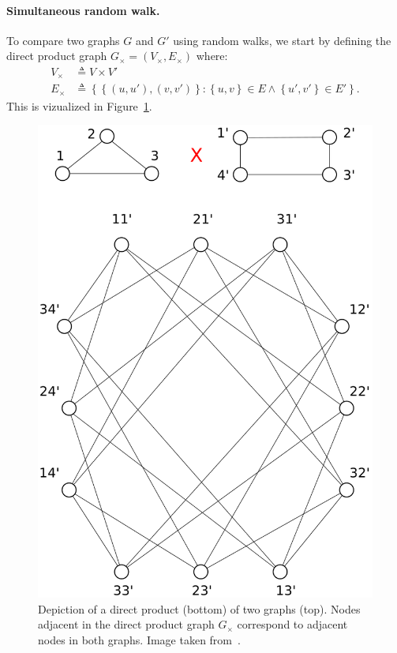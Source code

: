             \paragraph{Simultaneous random walk.}
                To compare two graphs \(G\) and \(G'\) using random walks, we start by defining the direct product graph $G_{\times} = \left(V_{\times}, E_{\times}\right)$ where:
                \begin{align}
                    \label{eq::direct_product_graph}
                    V_{\times} &\triangleq V \times V'\\
                    E_{\times} &\triangleq \left\{\left\{(u, u'), (v, v')\right\}: \left\{u,v\right\} \in E \wedge \left\{u',v'\right\} \in E'\right\}.
                \end{align}
                This is vizualized in Figure~\ref{fig::direct_product_graph}.
                \begin{figure}[htbp]
                    \centering
                    \includegraphics[height=.4\textheight]{images/related_work/direct_product_graphs}
                    \caption[
                        Depiction of a direct product of two graphs.
                    ]{
                        \label{fig::direct_product_graph}
                        Depiction of a direct product (bottom) of two graphs (top).
                        Nodes adjacent in the direct product graph $G_{\times}$ correspond to adjacent nodes in both graphs.
                        Image taken from~\parencite{vishwanathan2010graph}.
                    }
                \end{figure}

